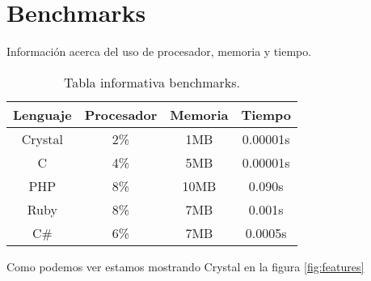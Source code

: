 \section{Benchmarks}\label{sec:benchmarks}
Información acerca del uso de procesador, memoria y tiempo.\\
\begin{table}[H]
	\centering
	\begin{tabular}{c c c c}
		\bfseries{Lenguaje} & \bfseries{Procesador} & \bfseries{Memoria} & \bfseries{Tiempo} \\ \hline
		Crystal & 2\% & 1MB & 0.00001s \\
		C & 4\% & 5MB & 0.00001s \\
		PHP & 8\% & 10MB & 0.090s \\
		Ruby & 8\% & 7MB & 0.001s \\
		C\# & 6\% & 7MB & 0.0005s \\
	\end{tabular}
	\caption[Tabla de Benchmarks]{Tabla informativa benchmarks.}
	\label{tab:benchmarks}
\end{table}

Como podemos ver estamos mostrando Crystal en la figura \ref{fig:features}
